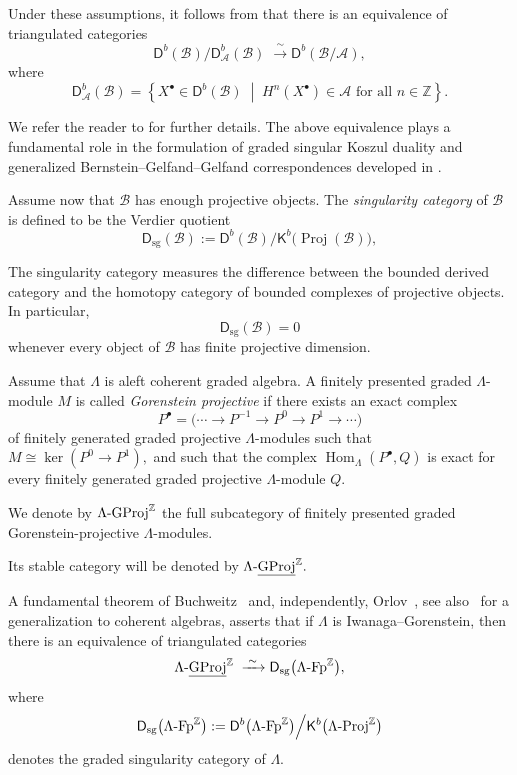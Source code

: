 \documentclass[11pt]{article}
\theoremstyle{definition}
\theoremstyle{remark}
\begin{document}
Under these assumptions, it follows from \cite[Theorem~2.18]{9} that there is an equivalence of triangulated categories
\[
\mathsf{D}^{b}(\mathcal{B})
\big/
\mathsf{D}^{b}_{\mathcal{A}}(\mathcal{B})
\;\xrightarrow{\;\sim\;}
\mathsf{D}^{b}(\mathcal{B}/\mathcal{A}),
\]
where
\[
\mathsf{D}^{b}_{\mathcal{A}}(\mathcal{B})
=
\left\{
X^\bullet\in\mathsf{D}^{b}(\mathcal{B})
\;\middle|\;
H^{n}(X^\bullet)\in\mathcal{A}
\text{ for all } n\in\mathbb Z
\right\}.
\]

We refer the reader to \cite{9} for further details. The above equivalence plays a fundamental role in the formulation of graded singular Koszul duality and generalized Bernstein--Gelfand--Gelfand correspondences developed in \cite{9}.

\medskip

Assume now that \(\mathcal{B}\) has enough projective objects. The \emph{singularity category} of \(\mathcal{B}\) is defined to be the Verdier quotient
\[
\mathsf{D}_{\mathrm{sg}}(\mathcal{B})
:=
\mathsf{D}^{b}(\mathcal{B})
\big/
\mathsf{K}^{b}\bigl(\operatorname{Proj}(\mathcal{B})\bigr),
\]

The singularity category measures the difference between the bounded derived category and the homotopy category of bounded complexes of projective objects. In particular,
\[
\mathsf{D}_{\mathrm{sg}}(\mathcal{B})=0
\]
whenever every object of \(\mathcal{B}\) has finite projective dimension. 

\medskip 

Assume that \(\Lambda\) is aleft coherent graded algebra. A finitely presented graded \(\Lambda\)-module \(M\) is called \emph{Gorenstein projective} if there exists an exact complex
\[
P^\bullet=
\bigl(
\cdots
\longrightarrow
P^{-1}
\longrightarrow
P^{0}
\longrightarrow
P^{1}
\longrightarrow
\cdots
\bigr)
\]
of finitely generated graded projective \(\Lambda\)-modules such that
\( 
M \cong \ker(P^{0}\to P^{1}),
\)
and such that the complex
\( 
\operatorname{Hom}_{\Lambda}(P^\bullet,Q)
\)
is exact for every finitely generated graded projective \(\Lambda\)-module \(Q\).

We denote by
\( 
\Lambda\textup{-GProj}^{\mathbb Z}
\)
the full subcategory of finitely presented graded Gorenstein-projective \(\Lambda\)-modules.

Its stable category will be denoted by
\( 
\Lambda\textup{-}\underline{\mathrm{GProj}}^{\mathbb Z}.
\)


A fundamental theorem of Buchweitz~\cite{13} and, independently, Orlov~\cite{34}, see also~\cite{14} for a generalization to coherent algebras, asserts that if \(\Lambda\) is Iwanaga--Gorenstein, then there is an equivalence of triangulated categories \[ \Lambda\textup{-}\underline{\mathrm{GProj}}^{\mathbb Z} \;\xrightarrow{\;\sim\;} \mathsf{D}_{\mathrm{sg}} \bigl(\Lambda\textup{-}\mathrm{Fp}^{\mathbb Z}\bigr), \] where \[ \mathsf{D}_{\mathrm{sg}} \bigl(\Lambda\textup{-}\mathrm{Fp}^{\mathbb Z}\bigr) := \mathsf{D}^{b} \bigl(\Lambda\textup{-}\mathrm{Fp}^{\mathbb Z}\bigr) \Big/ \mathsf{K}^{b} \bigl(\Lambda\textup{-}\mathrm{Proj}^{\mathbb Z}\bigr) \] denotes the graded singularity category of \(\Lambda\).
\end{document}
